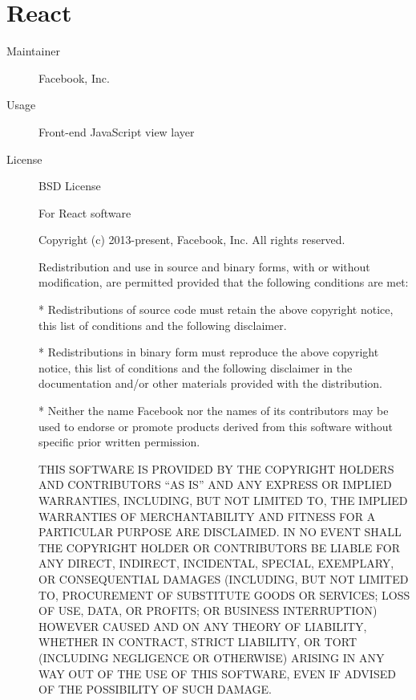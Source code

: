   \section*{React}
    \begin{description}
      \item[Maintainer] Facebook, Inc.
      \item[Usage] Front-end JavaScript view layer
      \item[License] \scriptsize BSD License

        For React software

        Copyright (c) 2013-present, Facebook, Inc.
        All rights reserved.

        Redistribution and use in source and binary forms, with or without modification,
        are permitted provided that the following conditions are met:

         * Redistributions of source code must retain the above copyright notice, this
           list of conditions and the following disclaimer.

         * Redistributions in binary form must reproduce the above copyright notice,
           this list of conditions and the following disclaimer in the documentation
           and/or other materials provided with the distribution.

         * Neither the name Facebook nor the names of its contributors may be used to
           endorse or promote products derived from this software without specific
           prior written permission.

        THIS SOFTWARE IS PROVIDED BY THE COPYRIGHT HOLDERS AND CONTRIBUTORS ``AS IS'' AND
        ANY EXPRESS OR IMPLIED WARRANTIES, INCLUDING, BUT NOT LIMITED TO, THE IMPLIED
        WARRANTIES OF MERCHANTABILITY AND FITNESS FOR A PARTICULAR PURPOSE ARE
        DISCLAIMED. IN NO EVENT SHALL THE COPYRIGHT HOLDER OR CONTRIBUTORS BE LIABLE FOR
        ANY DIRECT, INDIRECT, INCIDENTAL, SPECIAL, EXEMPLARY, OR CONSEQUENTIAL DAMAGES
        (INCLUDING, BUT NOT LIMITED TO, PROCUREMENT OF SUBSTITUTE GOODS OR SERVICES;
        LOSS OF USE, DATA, OR PROFITS; OR BUSINESS INTERRUPTION) HOWEVER CAUSED AND ON
        ANY THEORY OF LIABILITY, WHETHER IN CONTRACT, STRICT LIABILITY, OR TORT
        (INCLUDING NEGLIGENCE OR OTHERWISE) ARISING IN ANY WAY OUT OF THE USE OF THIS
        SOFTWARE, EVEN IF ADVISED OF THE POSSIBILITY OF SUCH DAMAGE.
    \end{description}

